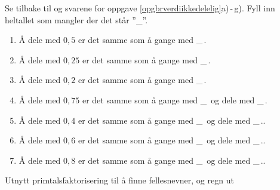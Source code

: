 \newpage
{}
Se tilbake til  og svarene for oppgave \ref{opgbrverdiikkedelelig}a)\,-\,g).
Fyll inn heltallet som mangler der det står ''\_''.
{\renewcommand{\labelenumi}{(\alph{enumi})}
	\begin{enumerate}
		\item Å dele med $ 0,5 $ er det samme som å gange med \_\,.
		\item Å dele med $ 0,25 $ er det samme som å gange med \_\,.
		\item Å dele med $ 0,2 $ er det samme som å gange med \_\,.
		\item Å dele med $ 0,75 $ er det samme som å gange med \_\, og dele med \_\,.
		\item Å dele med $ 0,4 $ er det samme som å gange med \_\, og dele med \_\,..
		\item Å dele med $ 0,6 $ er det samme som å gange med \_\, og dele med \_\,..
		\item Å dele med $ 0,8 $ er det samme som å gange med \_\, og dele med \_\,..	
\end{enumerate} }

Utnytt primtalsfaktorisering til å finne fellesnevner, og regn ut\os
{}
\newpage



